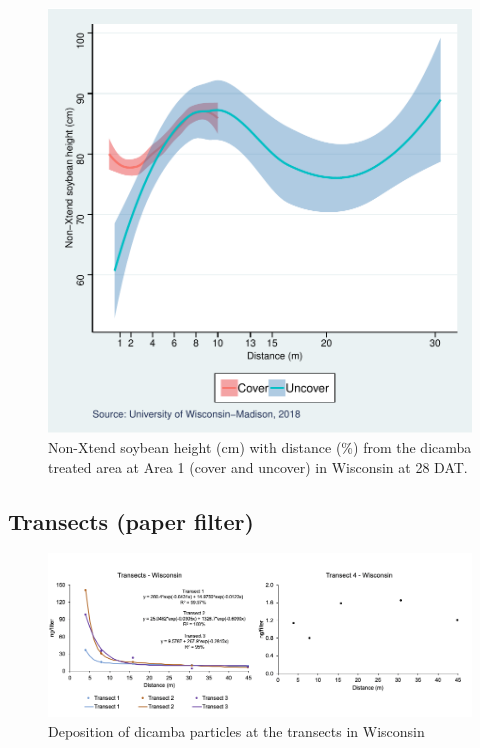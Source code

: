 \documentclass[]{article}
\begin{document}
\begin{figure}
\centering
\includegraphics{Report_files/figure-latex/unnamed-chunk-112-1.pdf}
\caption{Non-Xtend soybean height (cm) with distance (\%) from the
dicamba treated area at Area 1 (cover and uncover) in Wisconsin at 28
DAT.}
\end{figure}

\pagebreak
\newpage

\subsection{Transects (paper filter)}\label{transects-paper-filter-5}

\begin{figure}[h]

{\centering \includegraphics[width=1\linewidth]{Wisctransect} 

}

\caption{Deposition of dicamba particles at the transects in Wisconsin}\label{fig:unnamed-chunk-113}
\end{figure}
\end{document}

